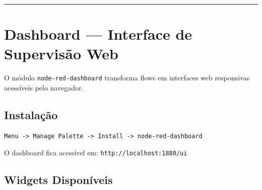 \begin{center}\rule{0.5\linewidth}{0.5pt}\end{center}

\section{\texorpdfstring{Dashboard --- Interface de Supervisão Web}{Dashboard  Interface de Supervisão Web}}\label{dashboard-interface-de-supervisuxe3o-web}

O módulo \passthrough{\lstinline!node-red-dashboard!} transforma flows em interfaces web responsivas acessíveis pelo navegador.

\subsection{Instalação}\label{instalauxe7uxe3o}

\begin{lstlisting}
Menu -> Manage Palette -> Install -> node-red-dashboard
\end{lstlisting}

O dashboard fica acessível em: \passthrough{\lstinline!http://localhost:1880/ui!}

\subsection{Widgets Disponíveis}\label{widgets-disponuxedveis}

